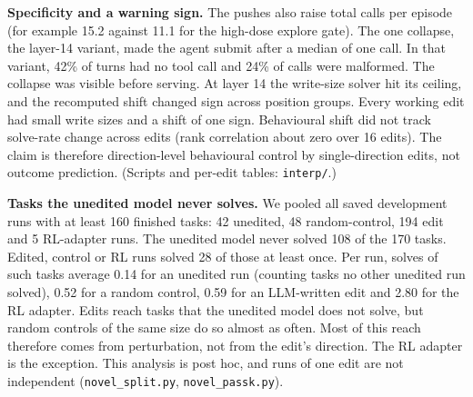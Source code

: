 \textbf{Specificity and a warning sign.} The pushes also raise total calls per episode (for example 15.2 against 11.1 for the high-dose explore gate). The one collapse, the layer-14 variant, made the agent submit after a median of one call. In that variant, 42\% of turns had no tool call and 24\% of calls were malformed. The collapse was visible before serving. At layer 14 the write-size solver hit its ceiling, and the recomputed shift changed sign across position groups. Every working edit had small write sizes and a shift of one sign. Behavioural shift did not track solve-rate change across edits (rank correlation about zero over 16 edits). The claim is therefore direction-level behavioural control by single-direction edits, not outcome prediction. (Scripts and per-edit tables: \texttt{interp/}.)

\textbf{Tasks the unedited model never solves.} We pooled all saved development runs with at least 160 finished tasks: 42 unedited, 48 random-control, 194 edit and 5 RL-adapter runs. The unedited model never solved 108 of the 170 tasks. Edited, control or RL runs solved 28 of those at least once. Per run, solves of such tasks average 0.14 for an unedited run (counting tasks no other unedited run solved), 0.52 for a random control, 0.59 for an LLM-written edit and 2.80 for the RL adapter. Edits reach tasks that the unedited model does not solve, but random controls of the same size do so almost as often. Most of this reach therefore comes from perturbation, not from the edit's direction. The RL adapter is the exception. This analysis is post hoc, and runs of one edit are not independent (\texttt{novel\_split.py}, \texttt{novel\_passk.py}).
